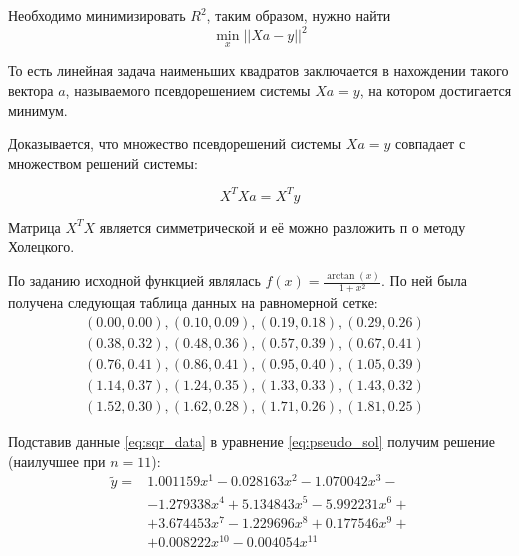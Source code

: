 \documentclass[a4paper, fontsize=14pt]{article}
\begin{document}
Необходимо минимизировать $R^2$, таким образом, нужно найти
\begin{equation*}
    \min_x || Xa - y ||^2
\end{equation*}

То есть линейная задача наименьших квадратов заключается
в нахождении такого вектора $a$, называемого псевдорешением
системы $Xa = y$, на котором достигается минимум.

Доказывается, что множество псевдорешений системы $Xa = y$ совпадает с множеством решений системы:

\begin{equation}
    \label{eq:pseudo_sol}
    X^T X a = X^T y
\end{equation}

Матрица $X^T X$ является симметрической и её можно разложить п  о методу Холецкого.

По заданию исходной функцией являлась $f(x) = \frac{\operatorname{arctan}(x)}{1 + x^2}$. По ней была получена следующая таблица данных на равномерной сетке:
\begin{equation}
    \label{eq:sqr_data}
    \begin{matrix}
        (0.00,0.00),(0.10,0.09),(0.19,0.18),(0.29,0.26) & \\
        (0.38,0.32),(0.48,0.36),(0.57,0.39),(0.67,0.41) & \\
        (0.76,0.41),(0.86,0.41),(0.95,0.40),(1.05,0.39) & \\
        (1.14,0.37),(1.24,0.35),(1.33,0.33),(1.43,0.32) & \\
        (1.52,0.30),(1.62,0.28),(1.71,0.26),(1.81,0.25) &
    \end{matrix}
\end{equation}

Подставив данные \eqref{eq:sqr_data} в уравнение \eqref{eq:pseudo_sol} получим решение (наилучшее при $n=11$):
\begin{equation}
    \label{eq:sqr_sol}
    \begin{aligned}
        \tilde{y} = & 1.001159x^{1}-0.028163x^{2}-1.070042x^{3} -   \\
                    & -1.279338x^{4}+5.134843x^{5}-5.992231x^{6} +  \\
                    & +3.674453x^{7} -1.229696x^{8}+0.177546x^{9} + \\
                    & + 0.008222x^{10}-0.004054x^{11}
    \end{aligned}
\end{equation}
\end{document}
